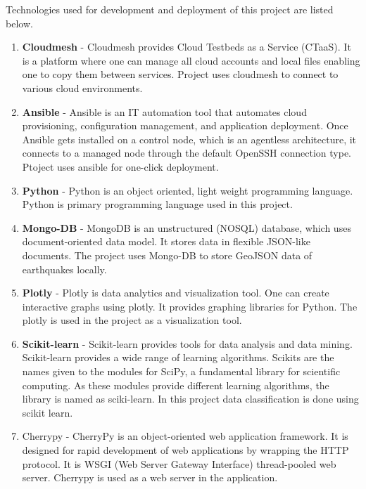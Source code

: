 \documentclass[9pt,twocolumn,twoside]{../../styles/osajnl}
\begin{document}
Technologies used for development and deployment of this project are listed below.
\begin{enumerate}

\item {\bfseries Cloudmesh} - Cloudmesh provides Cloud Testbeds as a Service (CTaaS). It is a platform where one can manage all cloud accounts and local files enabling one to copy them between services. Project uses cloudmesh to connect to various cloud environments.

\item {\bfseries Ansible} - Ansible is an IT automation tool that automates cloud provisioning, configuration management, and application deployment. Once Ansible gets installed on a control node, which is an agentless architecture, it connects to a managed node through the default OpenSSH connection type. Ptoject uses ansible for one-click deployment.

\item {\bfseries Python} - Python is an object oriented, light weight programming language. Python is primary programming language used in this project.

\item {\bfseries Mongo-DB} - MongoDB is an unstructured (NOSQL) database, which uses document-oriented data model. It stores data in flexible JSON-like documents. The project uses Mongo-DB to store GeoJSON data of earthquakes locally.

\item {\bfseries Plotly} - Plotly is data analytics and visualization tool. One can create interactive graphs using plotly. It provides graphing libraries for Python. The plotly is used in the project as a visualization tool.

\item {\bfseries Scikit-learn} - Scikit-learn provides tools for data analysis and data mining. Scikit-learn provides a wide range of learning algorithms. Scikits are the names given to the modules for SciPy, a fundamental library for scientific computing. As these modules provide different learning algorithms, the library is named as sciki-learn. In this project data classification is done using scikit learn.

\item {\bfserver Cherrypy} - CherryPy is an object-oriented web application framework. It is designed for rapid development of web applications by wrapping the HTTP protocol. It is WSGI (Web Server Gateway Interface) thread-pooled web server. Cherrypy is used as a web server in the application.
\end{enumerate}
\end{document}
